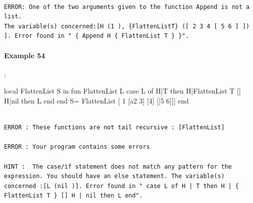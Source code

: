 \documentclass[11pt,a4paper,twoside,openright]{report}
\begin{document}
\begin{lstlisting}

ERROR: One of the two arguments given to the function Append is not a list. 
The variable(s) concerned:[H (1 ), {FlattenListT} ([ 2 3 4 [ 5 6 ] ]) ]. Error found in " { Append H { FlattenList T } }".
\end{lstlisting}

\paragraph{Example 54}:

\begin{OZ}
local FlattenList S in
	fun {FlattenList L}
		case L of H|T then H|{FlattenList T}
				[] H|nil then L
		end
	end
	S= {FlattenList [ 1 [a2 3] [4] [[5 6]]]}
end
\end{OZ}


\begin{lstlisting}

ERROR : These functions are not tail recursive : [FlattenList]

ERROR : Your program contains some errors

HINT :  The case/if statement does not match any pattern for the expression. You should have an else statement. The variable(s) concerned :[L (nil )]. Error found in " case L of H | T then H | { FlattenList T } [] H | nil then L end".
\end{lstlisting}


%
%
%
%
\newpage
\end{document}

